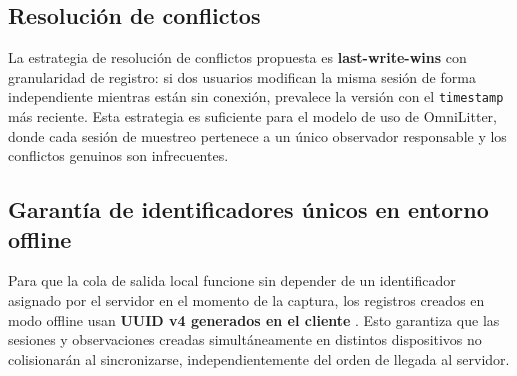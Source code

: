 \subsection{Resolución de conflictos}

La estrategia de resolución de conflictos propuesta es \textbf{last-write-wins} con
granularidad de registro: si dos usuarios modifican la misma sesión de forma
independiente mientras están sin conexión, prevalece la versión con el
\texttt{timestamp} más reciente. Esta estrategia es suficiente para el modelo de uso
de OmniLitter, donde cada sesión de muestreo pertenece a un único observador
responsable y los conflictos genuinos son infrecuentes.

\subsection{Garantía de identificadores únicos en entorno offline}

Para que la cola de salida local funcione sin depender de un identificador
asignado por el servidor en el momento de la captura, los registros creados en modo
offline usan \textbf{UUID v4 generados en el cliente} \cite{rfc9562uuid}. Esto garantiza que las
sesiones y observaciones creadas simultáneamente en distintos dispositivos no
colisionarán al sincronizarse, independientemente del orden de llegada al servidor.
